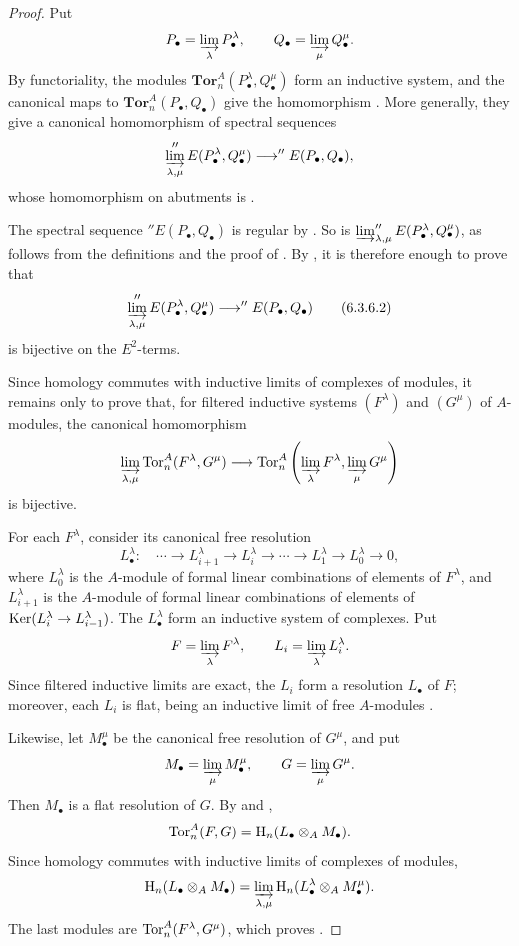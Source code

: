 \begin{proof}
Put
\[
  P_\bullet=\varinjlim_\lambda P_\bullet^\lambda,
  \qquad
  Q_\bullet=\varinjlim_\mu Q_\bullet^\mu.
\]
By functoriality, the modules
$\mathbf{Tor}_n^A(P_\bullet^\lambda,Q_\bullet^\mu)$ form an
inductive system, and
the canonical maps to
$\mathbf{Tor}_n^A(P_\bullet,Q_\bullet)$ give the homomorphism
.  More generally, they give a canonical
homomorphism of spectral sequences
\[
  \varinjlim_{\lambda,\mu}
  ''E(P_\bullet^\lambda,Q_\bullet^\mu)
  \longrightarrow
  ''E(P_\bullet,Q_\bullet),
\]
whose homomorphism on abutments is .

The spectral sequence $''E(P_\bullet,Q_\bullet)$ is regular by
.  So is
$\varinjlim_{\lambda,\mu}''E(P_\bullet^\lambda,Q_\bullet^\mu)$,
as follows from the definitions  and the proof
of .  By , it is therefore
enough to prove that
\[
  \varinjlim_{\lambda,\mu}
  ''E(P_\bullet^\lambda,Q_\bullet^\mu)
  \longrightarrow
  ''E(P_\bullet,Q_\bullet)
  \tag{6.3.6.2}\label{III.6.3.6.2}
\]
is bijective on the $E^2$-terms.

Since homology commutes with inductive limits of complexes of
modules, it remains only to prove that, for filtered inductive
systems $(F^\lambda)$ and $(G^\mu)$ of $A$-modules, the canonical
homomorphism
\[
  \varinjlim_{\lambda,\mu}\operatorname{Tor}_n^A(F^\lambda,G^\mu)
  \longrightarrow
  \operatorname{Tor}_n^A\left(
    \varinjlim_\lambda F^\lambda,
    \varinjlim_\mu G^\mu
  \right)
\]
is bijective.

For each $F^\lambda$, consider its canonical free resolution
\[
  L_\bullet^\lambda:\quad
  \cdots\longrightarrow L_{i+1}^\lambda
  \longrightarrow L_i^\lambda
  \longrightarrow\cdots\longrightarrow
  L_1^\lambda\longrightarrow L_0^\lambda\longrightarrow0,
\]
where $L_0^\lambda$ is the $A$-module of formal linear
combinations of elements of $F^\lambda$, and
$L_{i+1}^\lambda$ is the $A$-module of formal linear combinations
of elements of
$\operatorname{Ker}(L_i^\lambda\to L_{i-1}^\lambda)$.  The
$L_\bullet^\lambda$ form an inductive system of complexes.  Put
\[
  F=\varinjlim_\lambda F^\lambda,
  \qquad
  L_i=\varinjlim_\lambda L_i^\lambda.
\]
Since filtered inductive limits are exact, the $L_i$ form a
resolution $L_\bullet$ of $F$; moreover, each $L_i$ is flat, being
an inductive limit of free $A$-modules .

Likewise, let $M_\bullet^\mu$ be the canonical free resolution of
$G^\mu$, and put
\[
  M_\bullet=\varinjlim_\mu M_\bullet^\mu,
  \qquad
  G=\varinjlim_\mu G^\mu.
\]
Then $M_\bullet$ is a flat resolution of $G$.  By
 and ,
\[
  \operatorname{Tor}_n^A(F,G)=\mathrm H_n(L_\bullet\otimes_AM_\bullet).
\]
Since homology commutes with inductive limits of complexes of
modules,
\[
  \mathrm H_n(L_\bullet\otimes_AM_\bullet)
  =
  \varinjlim_{\lambda,\mu}
  \mathrm H_n(L_\bullet^\lambda\otimes_AM_\bullet^\mu).
\]
The last modules are $\operatorname{Tor}_n^A(F^\lambda,G^\mu)$, which proves
.


\end{proof}
